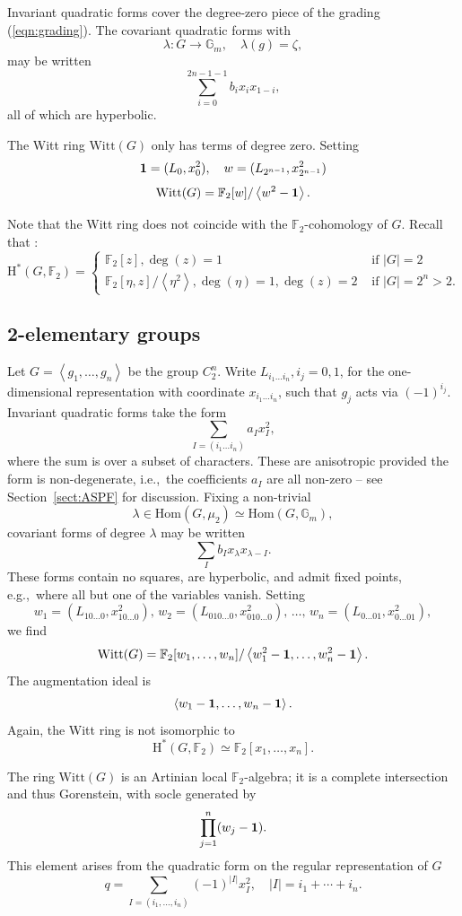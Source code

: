 \documentclass[12pt]{amsart}
\numberwithin{equation}{section}
\newcommand{\ra}{\rightarrow}
\newcommand{\bF}{\mathbb{F}}
\newcommand{\bG}{\mathbb{G}}
\newcommand{\rH}{\mathrm{H}}
\newcommand{\Hom}{\mathrm{Hom}}
\newcommand{\Witt}{\mathrm{Witt}}
\theoremstyle{plain}
\theoremstyle{definition}
\theoremstyle{remark}
\begin{document}
Invariant quadratic forms cover the degree-zero piece
of the grading (\ref{eqn:grading}).
The covariant quadratic forms with 
$$\lambda:G \ra \bG_m,\quad \lambda(g)=\zeta,$$
may be written
$$\sum_{i=0}^{2{n-1}-1} b_i x_i x_{1-i},$$
all of which are hyperbolic. 

The Witt ring $\Witt(G)$ 
only has terms of degree zero. Setting
$${\bf 1}=(L_0,x_0^2), \quad w=(L_{2^{n-1}},x_{2^{n-1}}^2)$$
$$\Witt(G)=\bF_2[w]/\left<w^2-{\bf 1}\right>.$$

Note that the Witt ring does not coincide with the $\bF_2$-cohomology of $G$.  Recall that \cite[Prop.~4.5.1]{CarlsonBook}:
$$\rH^*(G,\bF_2)=\begin{cases} \bF_2[z],  \deg(z)=1 & \text{ if } |G|=2 \\
                               \bF_2[\eta,z]/\left<\eta^2\right>, 
                                    \deg(\eta)=1,\deg(z)=2 
                                    & \text{ if } |G|=2^n>2.
                    \end{cases}
$$

\subsection*{2-elementary groups}
Let $G=\left<g_1,\ldots,g_n\right>$ be the group $C_2^n$.
Write $L_{i_1\ldots i_n}, i_j=0,1$, for the 
one-dimensional representation with coordinate $x_{i_1\ldots i_n}$,
such that $g_j$ acts via $(-1)^{i_j}$. Invariant quadratic
forms take the form
$$\sum_{I=(i_1\ldots i_n)} a_I x_I^2,$$
where the sum is over a subset of characters.
These are anisotropic provided the form is non-degenerate, i.e.,~the coefficients $a_I$ are all non-zero -- see Section~\ref{sect:ASPF}
for discussion.
Fixing a non-trivial 
$$\lambda \in \Hom(G,\mu_2)\simeq \Hom(G,\bG_m),$$
covariant forms of degree $\lambda$ may be written
$$\sum_I b_I x_{\lambda} x_{\lambda-I}.$$
These forms contain no squares, are 
hyperbolic, and admit fixed points, e.g.,~where all
but one of the variables vanish. Setting 
$$w_1=(L_{10\ldots 0},x_{10\ldots 0}^2),\, 
w_2=(L_{010\ldots 0},x_{010\ldots 0}^2),\, \ldots,\, 
w_n=(L_{0\ldots 01},x_{0\ldots 01}^2),
$$
we find
$$\Witt(G)=\bF_2[w_1,\ldots,w_n]/\left<w_1^2-{\bf 1},\ldots,
w_n^2 - {\bf 1}\right>.$$
The augmentation ideal is
$$
\left<w_1 - {\bf 1},\ldots, w_n-{\bf 1}\right>.
$$
Again, the Witt ring is not isomorphic to 
$$
\rH^*(G,\bF_2) \simeq \bF_2[x_1,\ldots,x_n].
$$

The ring $\Witt(G)$ is an Artinian local $\bF_2$-algebra;
it is a complete intersection and thus Gorenstein,
with socle generated by 
$$
\prod_{j=1}^n (w_j - {\bf 1}).
$$
This element arises from the quadratic form on the 
regular representation of $G$
$$q=\sum_{I=(i_1,\ldots,i_n)}(-1)^{|I|}
x_I^2, \quad |I|=i_1+\cdots+i_n.$$
\end{document}
